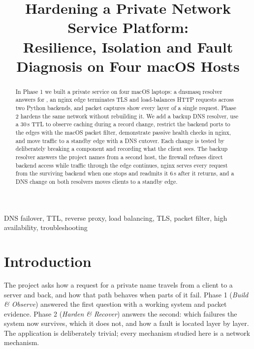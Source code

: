 \documentclass[conference]{IEEEtran}
\newcommand{\code}[1]{\texttt{\detokenize{#1}}}
\begin{document}
\title{Hardening a Private Network Service Platform:\\
Resilience, Isolation and Fault Diagnosis on Four macOS Hosts}

\author{
}

\maketitle

\begin{abstract}
In Phase 1 we built a private service on four macOS laptops: a dnsmasq
resolver answers for \code{app.team1.test}, an nginx edge terminates TLS
and load-balances HTTP requests across two Python backends, and packet
captures show every layer of a single request. Phase 2 hardens the same
network without rebuilding it. We add a backup DNS resolver, use a 30\,s
TTL to observe caching during a record change, restrict the backend ports
to the edges with the macOS packet filter, demonstrate passive health
checks in nginx, and move traffic to a standby edge with a DNS cutover.
Each change is tested by deliberately breaking a component and recording
what the client sees. The backup resolver answers the project names
from a second host, the firewall refuses direct backend access while
traffic through the edge continues, nginx serves every request from the
surviving backend when one stops and readmits it 6\,s after it returns,
and a DNS change on both resolvers moves clients to a standby edge.
\end{abstract}

\begin{IEEEkeywords}
DNS failover, TTL, reverse proxy, load balancing, TLS, packet filter,
high availability, troubleshooting
\end{IEEEkeywords}

\section{Introduction}
The project asks how a request for a private name travels from a client
to a server and back, and how that path behaves when parts of it fail.
Phase 1 (\emph{Build \& Observe}) answered the first question with a
working system and packet evidence. Phase 2 (\emph{Harden \& Recover})
answers the second: which failures the system now survives, which it
does not, and how a fault is located layer by layer. The application is
deliberately trivial; every mechanism studied here is a network
mechanism.
\end{document}

